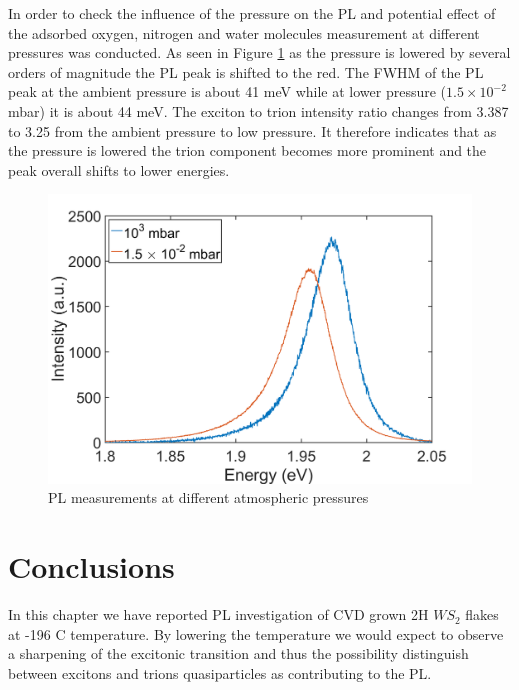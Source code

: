 In order to check the influence of the pressure on the PL and potential effect of the adsorbed oxygen, nitrogen and water molecules measurement at different pressures was conducted. As seen in Figure \ref{fig:LowTPLPressureDifference} as the pressure is lowered by several orders of magnitude the PL peak is shifted to the red. The FWHM of the PL peak at the ambient pressure is about 41 meV while at lower pressure ($1.5 \times 10^{-2}$ mbar) it is about 44 meV. The exciton to trion intensity ratio changes from 3.387 to 3.25 from the ambient pressure to low pressure. It therefore indicates that as the pressure is lowered the trion component becomes more prominent and the peak overall shifts to lower energies. 

\begin{figure}[!ht]
	\begin{center}
		\includegraphics[scale=0.4]{LowT/LowTPLPressureDifference.png}
		\caption{PL measurements at different atmospheric pressures}
		\label{fig:LowTPLPressureDifference}
	\end{center}
\end{figure}

\section{Conclusions}

In this chapter we have reported PL investigation of CVD grown 2H $WS_2$ flakes at -196 {\degree}C temperature. By lowering the temperature we would expect to observe a sharpening of the excitonic transition and thus the possibility distinguish between excitons and trions quasiparticles as contributing to the PL.
